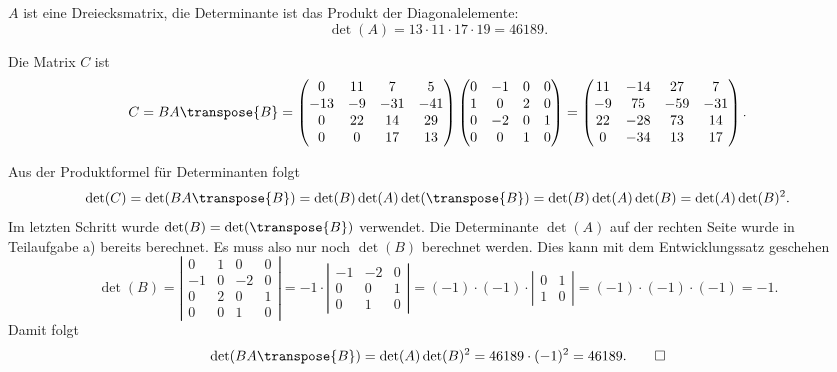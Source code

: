 \begin{loesung}
\begin{teilaufgaben}
\item $A$ ist eine Dreiecksmatrix, die Determinante ist das Produkt der
Diagonalelemente:
\[
\det(A) = 13\cdot 11 \cdot 17\cdot 19=46189.
\]
\item Die Matrix $C$ ist
\[
C
=
BA\transpose{B}
=
\begin{pmatrix}
  0& 11&  7&  5\\
-13& -9&-31&-41\\
  0& 22& 14& 29\\
  0&  0& 17& 13
\end{pmatrix}
\begin{pmatrix}
   0& -1&  0&  0\\
   1&  0&  2&  0\\
   0& -2&  0&  1\\
   0&  0&  1&  0
\end{pmatrix}
=
\begin{pmatrix}
   11& -14&  27&   7\\
   -9&  75& -59& -31\\
   22& -28&  73&  14\\
    0& -34&  13&  17
\end{pmatrix}.
\]
\item Aus der Produktformel für Determinanten folgt
\[
\det(C)
=
\det(BA\transpose{B})
=
\det(B)\det(A)\det(\transpose{B})
=
\det(B)\det(A)\det(B)
=
\det(A)\det(B)^2.
\]
Im letzten Schritt wurde $\det(B)=\det(\transpose{B})$ verwendet.
Die Determinante $\det(A)$ auf der rechten Seite wurde in Teilaufgabe a)
bereits berechnet.
Es muss also nur noch $\det(B)$ berechnet werden.
Dies kann mit dem Entwicklungssatz geschehen
\[
\det(B)
=
\left|
\begin{matrix}
 0&  1&  0&  0\\
-1&  0& -2&  0\\
 0&  2&  0&  1\\
 0&  0&  1&  0
\end{matrix}\right|
=
-1\cdot
\left|\begin{matrix}
-1& -2&  0\\
 0&  0&  1\\
 0&  1&  0
\end{matrix}\right|
=
(-1)\cdot(-1)\cdot
\left|\begin{matrix}
0&  1\\
1&  0
\end{matrix}\right|
=(-1)\cdot(-1)\cdot(-1)=-1.
\]
Damit folgt
\[
\det(BA\transpose{B})
=
\det(A)\det(B)^2
=
46189\cdot(-1)^2=46189.\qedhere
\]
\end{teilaufgaben}
\end{loesung}

